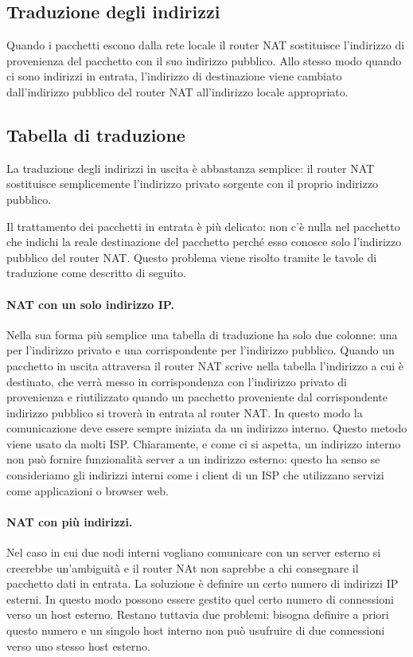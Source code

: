     \subsection{Traduzione degli indirizzi}
        Quando i pacchetti escono dalla rete locale il router NAT sostituisce l'indirizzo di provenienza del pacchetto con il suo indirizzo pubblico. Allo stesso modo quando ci sono indirizzi in entrata, l'indirizzo di destinazione viene cambiato dall'indirizzo pubblico del router NAT all'indirizzo locale appropriato.
        
    \subsection{Tabella di traduzione}
        La traduzione degli indirizzi in uscita è abbastanza semplice: il router NAT sostituisce semplicemente l'indirizzo privato sorgente con il proprio indirizzo pubblico.
        
        Il trattamento dei pacchetti in entrata è più delicato: non c'è nulla nel pacchetto che indichi la reale destinazione del pacchetto perché esso conosce solo l'indirizzo pubblico del router NAT. Questo problema viene risolto tramite le tavole di traduzione come descritto di seguito.
        
        \paragraph{NAT con un solo indirizzo IP.} Nella sua forma più semplice una tabella di traduzione ha solo due colonne: una per l'indirizzo privato e una corrispondente per l'indirizzo pubblico. Quando un pacchetto in uscita attraversa il router NAT scrive nella tabella l'indirizzo a cui è destinato, che verrà messo in corrispondenza con l'indirizzo privato di provenienza e riutilizzato quando un pacchetto proveniente dal corrispondente indirizzo pubblico si troverà in entrata al router NAT. In questo modo la comunicazione deve essere sempre iniziata da un indirizzo interno. Questo metodo viene usato da molti ISP. Chiaramente, e come ci si aspetta, un indirizzo interno non può fornire funzionalità server a un indirizzo esterno: questo ha senso se consideriamo gli indirizzi interni come i client di un ISP che utilizzano servizi come applicazioni o browser web.
        
        \paragraph{NAT con più indirizzi.} Nel caso in cui due nodi interni vogliano comunicare con un server esterno si creerebbe un'ambiguità e il router NAt non saprebbe a chi consegnare il pacchetto dati in entrata. La soluzione è definire un certo numero di indirizzi IP esterni. In questo modo possono essere gestito quel certo numero di connessioni verso un host esterno. Restano tuttavia due problemi: bisogna definire a priori questo numero e un singolo host interno non può usufruire di due connessioni verso uno stesso host esterno.
        
